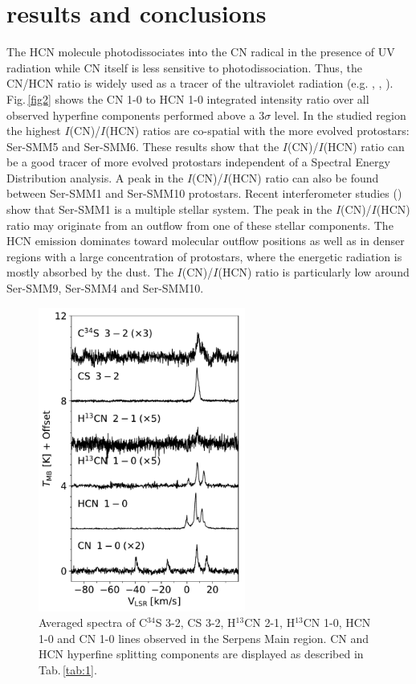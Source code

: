 \documentclass[a4paper]{article}
\begin{document}
\section*{\sc results and conclusions}
\indent \indent The HCN molecule photodissociates into the CN radical in the presence of UV radiation while CN itself is less sensitive to photodissociation. Thus, the CN/HCN ratio is widely used as a tracer of the ultraviolet radiation (e.g. \cite{fuente1995}, \cite{chapillon2012}, \cite{riaz2018}). Fig.\,\ref{fig2} shows the CN 1-0 to HCN 1-0 integrated intensity ratio over all observed hyperfine components performed above a $3\sigma$ level. In the studied region the highest $I$(CN)/$I$(HCN) ratios are co-spatial with the more evolved protostars: Ser-SMM5 and Ser-SMM6. These results show that the $I$(CN)/$I$(HCN) ratio can be a good tracer of more evolved protostars independent of a Spectral Energy Distribution analysis. A peak in the $I$(CN)/$I$(HCN) ratio can also be found between Ser-SMM1 and Ser-SMM10 protostars. Recent interferometer studies (\cite{hull2017}) show that Ser-SMM1 is a multiple stellar system. The peak in the $I$(CN)/$I$(HCN) ratio may originate from an outflow from one of these stellar components. The HCN emission dominates toward molecular outflow positions as well as in denser regions with a large concentration of protostars, where the energetic radiation is mostly absorbed by the dust. The $I$(CN)/$I$(HCN) ratio is particularly low around Ser-SMM9, Ser-SMM4 and Ser-SMM10.

\begin{figure}[!h]
\centering
\includegraphics[height=10cm]{serpens_spectra.pdf}
\caption{Averaged spectra of C$^{34}$S 3-2, CS 3-2, H$^{13}$CN 2-1, H$^{13}$CN 1-0, HCN 1-0 and CN 1-0 lines observed in the Serpens Main region. CN and HCN hyperfine splitting components are displayed as described in Tab.\,\ref{tab:1}.}
\label{fig1}
\end{figure}
\end{document}
